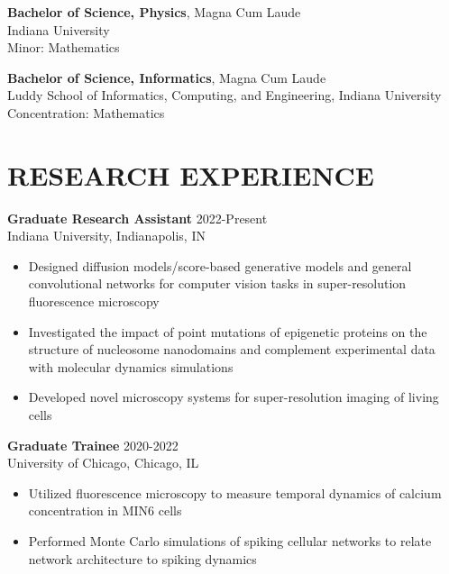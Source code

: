 \documentclass[margin, 10pt]{res} %
\begin{document}
\begin{resume}
\textbf{Bachelor of Science, Physics}, Magna Cum Laude\\
Indiana University\\
Minor: Mathematics 

\textbf{Bachelor of Science, Informatics}, Magna Cum Laude\\
Luddy School of Informatics, Computing, and Engineering, Indiana University\\
Concentration: Mathematics 
  
 
\section{RESEARCH EXPERIENCE}

\textbf{Graduate Research Assistant} \hfill 2022-Present \\
Indiana University, Indianapolis, IN

\begin{itemize} \itemsep -2pt %

\item Designed diffusion models/score-based generative models and general convolutional networks for computer vision tasks in super-resolution fluorescence microscopy

\item Investigated the impact of point mutations of epigenetic proteins on the structure of nucleosome nanodomains and complement experimental data with molecular dynamics simulations

\item Developed novel microscopy systems for super-resolution imaging of living cells 
 
\end{itemize}

\textbf{Graduate Trainee} \hfill 2020-2022 \\
University of Chicago, Chicago, IL

\begin{itemize} \itemsep -2pt %

\item Utilized fluorescence microscopy to measure temporal dynamics of calcium concentration in MIN6 cells
\item Performed Monte Carlo simulations of spiking cellular networks to relate network architecture to spiking dynamics
 

\end{itemize}
\end{resume}
\end{document}
